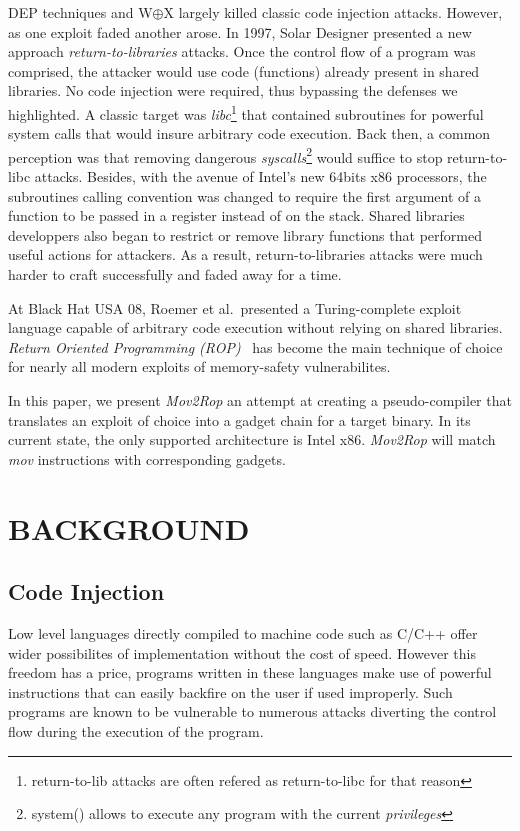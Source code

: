 \documentclass[10pt,twocolumn]{article}
\begin{document}
DEP techniques and W$\oplus$X largely killed classic code injection attacks.
However, as one exploit faded another arose. In 1997, Solar Designer presented
a new approach \textit{return-to-libraries}\cite{solar_returnintolib_1997}
attacks. Once the control flow of a program was comprised, the attacker would
use code (functions) already present in shared libraries. No code injection
were required, thus bypassing the defenses we highlighted. A classic target was
\textit{libc}\footnote{return-to-lib attacks are often refered as
return-to-libc for that reason} that contained subroutines for powerful
system calls that would insure arbitrary code execution. Back then, a
common perception was that removing dangerous
\textit{syscalls}\footnote{system() allows to execute any program with the
current \textit{privileges}} would suffice to stop return-to-libc attacks.
Besides, with the avenue of Intel's new 64bits x86 processors, the
subroutines calling convention was changed to require the first argument of
a function to be passed in a register instead of on the stack. Shared
libraries developpers also began to restrict or remove library functions
that performed useful actions for attackers. As a result,
return-to-libraries attacks were much harder to craft successfully and
faded away for a time.

At Black Hat USA 08, Roemer et al.\  presented a Turing-complete exploit
language capable of arbitrary code execution without relying on shared
libraries. \textit{Return Oriented Programming
(ROP)}~\cite{roemer_return-oriented_2012} has become the main technique of
choice for nearly all modern exploits of memory-safety vulnerabilites.

In this paper, we present \textit{Mov2Rop} an attempt at creating a
pseudo-compiler that translates an exploit of choice into a gadget chain
for a target binary. In its current state, the only supported architecture is
Intel x86. \textit{Mov2Rop} will match \textit{mov} instructions with
corresponding gadgets. 


\section{BACKGROUND}
\subsection{Code Injection}
Low level languages directly compiled to machine code such as C/C++ offer wider
possibilites of implementation without the cost of speed. However this freedom
has a price, programs written in these languages make use of powerful
instructions that can easily backfire on the user if used improperly. Such
programs are known to be vulnerable to numerous attacks diverting the control
flow during the execution of the program.
\end{document}
